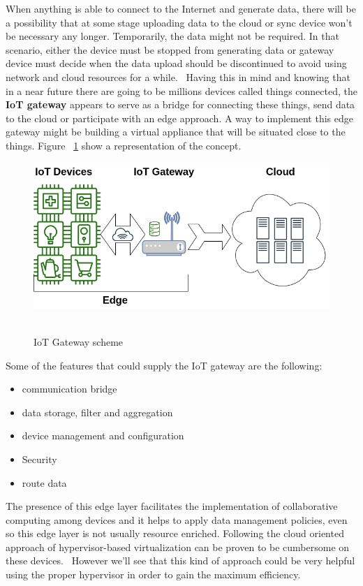 When anything is able to connect to the Internet and generate data, there will be a possibility that at some stage uploading data to the cloud or sync device won't be necessary any longer. Temporarily, the data might not be required. In that scenario, either the device must be stopped from generating data or gateway device must decide when the data upload should be discontinued to avoid using network and cloud resources for a while.~\cite{Ficloud:AazaamHuh:2014}
Having this in mind and knowing that in a near future there are going to be millions devices called things connected, the \textbf{IoT gateway} appears to serve as a bridge for connecting these things, send data to the cloud or participate with an edge approach. A way to implement this edge gateway might be building a virtual appliance that will be situated close to the things. Figure ~\ref{figure1.1} show a representation of the concept.


\newpage
\begin{figure}[h]%
    \includegraphics[width=6.5in]{figures/iot_gateway.png}
~\caption{IoT Gateway scheme}
\label{figure1.1}
\end{figure}

Some of the features that could supply the IoT gateway are the following:

\begin{itemize}
  \item communication bridge
  \item data storage, filter and aggregation
  \item device management and configuration
  \item Security 
  \item route data
\end{itemize}

The presence of this edge layer facilitates the implementation of collaborative computing among devices and it helps to apply data management policies, even so this edge layer is not usually resource enriched. Following the cloud oriented approach of hypervisor-based virtualization can be proven to be cumbersome on these devices.~\cite{arxiv:doluikiraly:2018}
However we'll see that this kind of approach could be very helpful using the proper hypervisor in order to gain the maximum efficiency.

